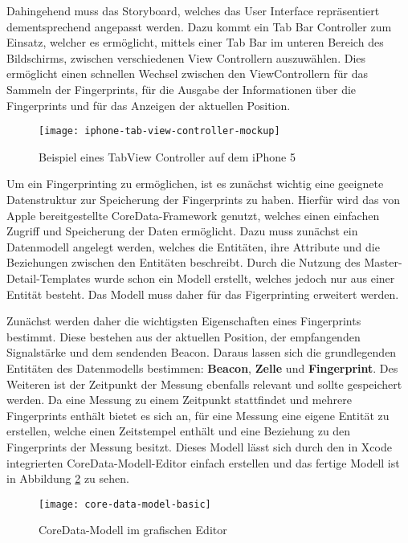 Dahingehend muss das Storyboard, welches das User Interface repräsentiert dementsprechend angepasst werden.
Dazu kommt ein Tab Bar Controller zum Einsatz, welcher es ermöglicht, mittels einer Tab Bar im unteren Bereich des Bildschirms, zwischen verschiedenen View Controllern auszuwählen. Dies ermöglicht einen schnellen Wechsel zwischen den ViewControllern für das Sammeln der Fingerprints, für die Ausgabe der Informationen über die Fingerprints und für das Anzeigen der aktuellen Position.

\begin{figure}[htb!]
		\centering
	\texttt{[image: iphone-tab-view-controller-mockup]}
	\caption{Beispiel eines TabView Controller auf dem iPhone 5}
	\label{iphone-tab-view-controller}
\end{figure}

Um ein Fingerprinting zu ermöglichen, ist es zunächst wichtig eine geeignete Datenstruktur zur Speicherung der Fingerprints zu haben. Hierfür wird das von Apple bereitgestellte CoreData-Framework genutzt, welches einen einfachen Zugriff und Speicherung der Daten ermöglicht. Dazu muss zunächst ein Datenmodell angelegt werden, welches die Entitäten, ihre Attribute und die Beziehungen zwischen den Entitäten beschreibt. Durch die Nutzung des Master-Detail-Templates wurde schon ein Modell erstellt, welches jedoch nur aus einer Entität besteht. Das Modell muss daher für das Figerprinting erweitert werden.

Zunächst werden daher die wichtigsten Eigenschaften eines Fingerprints bestimmt. Diese bestehen aus der aktuellen Position, der empfangenden Signalstärke und dem sendenden Beacon. Daraus lassen sich die grundlegenden Entitäten des Datenmodells bestimmen: \textbf{Beacon}, \textbf{Zelle} und \textbf{Fingerprint}. Des Weiteren ist der Zeitpunkt der Messung ebenfalls relevant und sollte gespeichert werden. Da eine Messung zu einem Zeitpunkt stattfindet und mehrere Fingerprints enthält bietet es sich an, für eine Messung eine eigene Entität zu erstellen, welche einen Zeitstempel enthält und eine Beziehung zu den Fingerprints der Messung besitzt. 
Dieses Modell lässt sich durch den in Xcode integrierten CoreData-Modell-Editor einfach erstellen und das fertige Modell ist in Abbildung \ref{core-data-model-basic} zu sehen.

\begin{figure}[htb!]
		\centering
	\texttt{[image: core-data-model-basic]}
	\caption{CoreData-Modell im grafischen Editor}
	\label{core-data-model-basic}
\end{figure}

